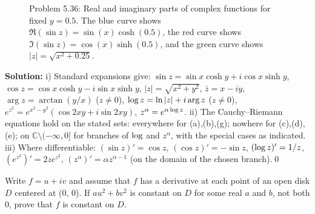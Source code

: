 \begin{figure}[h]
\centering
{}
\caption{Problem 5.36: Real and imaginary parts of complex functions for fixed $y = 0.5$. The blue curve shows $\Re(\sin z) = \sin(x)\cosh(0.5)$, the red curve shows $\Im(\sin z) = \cos(x)\sinh(0.5)$, and the green curve shows $|z| = \sqrt{x^2 + 0.25}$.}
\end{figure}

\bigskip\noindent\textbf{Solution:}
i) Standard expansions give: $\sin z=\sin x\cosh y+i\cos x\sinh y$, $\cos z=\cos x\cosh y-i\sin x\sinh y$, $|z|=\sqrt{x^2+y^2}$, $\bar z=x-iy$, $\arg z=\arctan(y/x)$ ($z\ne 0$), $\log z=\ln|z|+i\arg z$ ($z\ne 0$), $e^{z^2}=e^{x^2-y^2}(\cos 2xy+i\sin 2xy)$, $z^{\alpha}=e^{\alpha\log z}$.\newline
ii) The Cauchy–Riemann equations hold on the stated sets: everywhere for (a),(b),(g); nowhere for (c),(d),(e); on $\mathbb{C}\setminus(-\infty,0]$ for branches of $\log$ and $z^{\alpha}$, with the special cases as indicated.\newline
iii) Where differentiable: $(\sin z)'=\cos z$, $(\cos z)'=-\sin z$, $(\log z)'=1/z$, $(e^{z^2})'=2z e^{z^2}$, $(z^{\alpha})'=\alpha z^{\alpha-1}$ (on the domain of the chosen branch).\qed


\begin{problembox}
Write \( f = u + iv \) and assume that \( f \) has a derivative at each point of an open disk \( D \) centered at (0, 0). If \( au^2 + bv^2 \) is constant on \( D \) for some real \( a \) and \( b \), not both 0, prove that \( f \) is constant on \( D \).
\end{problembox}

